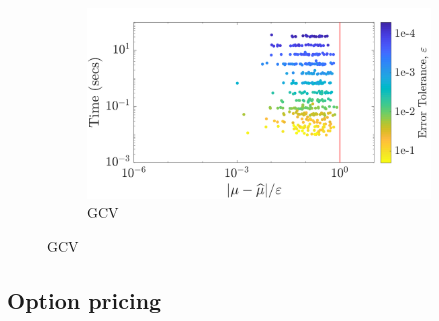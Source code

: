 \documentclass[handout, 10pt,compress,xcolor={usenames,dvipsnames}]{beamer} %
\begin{document}
{\begin{figure}[htp]
\begin{subfigure}[b]{0.43\textwidth}
			\includegraphics[width=\textwidth]{"../figures/Sobol/Sobol_Keister_guaranteed_time_GCV__d4_r1_2019-Sep-1"}
			\caption{GCV}
		\end{subfigure}
	\end{figure}
}



\subsection{Option pricing}
\end{document}

